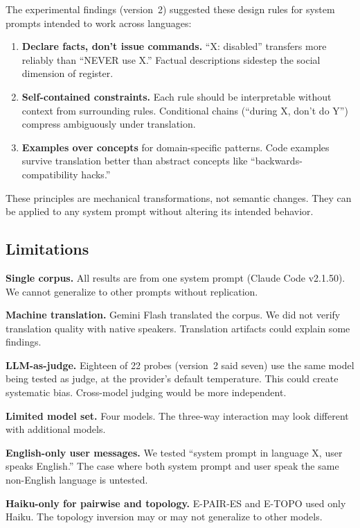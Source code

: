 \documentclass[11pt,a4paper]{article}
\begin{document}
The experimental findings (version~2) suggested these design rules for system
prompts intended to work across languages:

\begin{enumerate}[nosep]
\item \textbf{Declare facts, don't issue commands.} ``X: disabled''
  transfers more reliably than ``NEVER use X.'' Factual descriptions
  sidestep the social dimension of register.
\item \textbf{Self-contained constraints.} Each rule should be
  interpretable without context from surrounding rules. Conditional
  chains (``during X, don't do Y'') compress ambiguously under
  translation.
\item \textbf{Examples over concepts} for domain-specific patterns.
  Code examples survive translation better than abstract concepts
  like ``backwards-compatibility hacks.''
\end{enumerate}

These principles are mechanical transformations, not semantic changes.
They can be applied to any system prompt without altering its intended
behavior.

\subsection{Limitations}
\label{sec:limitations}

\textbf{Single corpus.} All results are from one system prompt (Claude
Code v2.1.50). We cannot generalize to other prompts without
replication.

\textbf{Machine translation.} Gemini Flash translated the corpus. We
did not verify translation quality with native speakers. Translation
artifacts could explain some findings.

\textbf{LLM-as-judge.} Eighteen of 22 probes (version~2 said seven)
use the same model being tested as judge, at the provider's default
temperature. This could create systematic bias. Cross-model
judging would be more independent.

\textbf{Limited model set.} Four models. The three-way interaction may
look different with additional models.

\textbf{English-only user messages.} We tested ``system prompt in
language X, user speaks English.'' The case where both system prompt
and user speak the same non-English language is untested.

\textbf{Haiku-only for pairwise and topology.} E-PAIR-ES and E-TOPO
used only Haiku. The topology inversion may or may not generalize to
other models.
\end{document}
